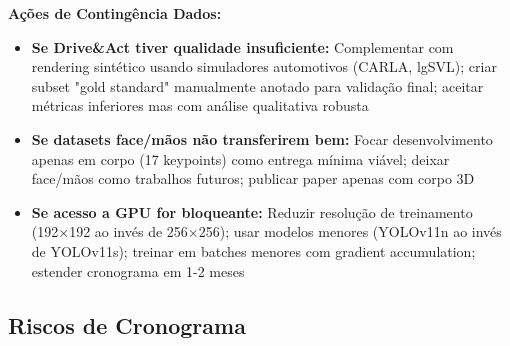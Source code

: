 \documentclass[12pt, a4paper]{article}
\begin{document}
\textbf{Ações de Contingência Dados:}
\begin{itemize}
    \item \textbf{Se Drive\&Act tiver qualidade insuficiente:} Complementar com rendering sintético usando simuladores automotivos (CARLA, lgSVL); criar subset "gold standard" manualmente anotado para validação final; aceitar métricas inferiores mas com análise qualitativa robusta
    
    \item \textbf{Se datasets face/mãos não transferirem bem:} Focar desenvolvimento apenas em corpo (17 keypoints) como entrega mínima viável; deixar face/mãos como trabalhos futuros; publicar paper apenas com corpo 3D
    
    \item \textbf{Se acesso a GPU for bloqueante:} Reduzir resolução de treinamento (192×192 ao invés de 256×256); usar modelos menores (YOLOv11n ao invés de YOLOv11s); treinar em batches menores com gradient accumulation; estender cronograma em 1-2 meses
\end{itemize}

\subsection{Riscos de Cronograma}
\end{document}
